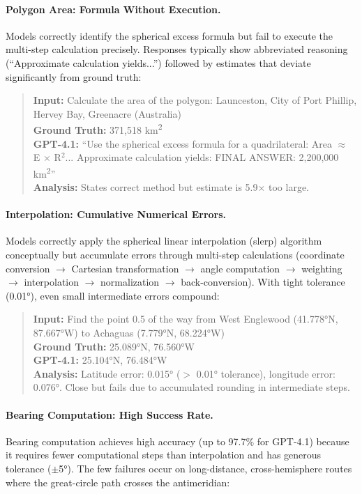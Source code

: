 \paragraph{Polygon Area: Formula Without Execution.}
Models correctly identify the spherical excess formula but fail to execute the multi-step calculation precisely. Responses typically show abbreviated reasoning (``Approximate calculation yields...'') followed by estimates that deviate significantly from ground truth:

\begin{quote}
\small
\textbf{Input:} Calculate the area of the polygon: Launceston, City of Port Phillip, Hervey Bay, Greenacre (Australia)\\
\textbf{Ground Truth:} 371,518 km\textsuperscript{2}\\
\textbf{GPT-4.1:} ``Use the spherical excess formula for a quadrilateral: Area $\approx$ E $\times$ R$^2$... Approximate calculation yields: FINAL ANSWER: 2,200,000 km\textsuperscript{2}''\\
\textbf{Analysis:} States correct method but estimate is 5.9$\times$ too large.
\end{quote}

\paragraph{Interpolation: Cumulative Numerical Errors.}
Models correctly apply the spherical linear interpolation (slerp) algorithm conceptually but accumulate errors through multi-step calculations (coordinate conversion $\rightarrow$ Cartesian transformation $\rightarrow$ angle computation $\rightarrow$ weighting $\rightarrow$ interpolation $\rightarrow$ normalization $\rightarrow$ back-conversion). With tight tolerance (0.01°), even small intermediate errors compound:

\begin{quote}
\small
\textbf{Input:} Find the point 0.5 of the way from West Englewood (41.778°N, 87.667°W) to Achaguas (7.779°N, 68.224°W)\\
\textbf{Ground Truth:} 25.089°N, 76.560°W\\
\textbf{GPT-4.1:} 25.104°N, 76.484°W\\
\textbf{Analysis:} Latitude error: 0.015° ($>$ 0.01° tolerance), longitude error: 0.076°. Close but fails due to accumulated rounding in intermediate steps.
\end{quote}

\paragraph{Bearing Computation: High Success Rate.}
Bearing computation achieves high accuracy (up to 97.7\% for GPT-4.1) because it requires fewer computational steps than interpolation and has generous tolerance ($\pm$5°). The few failures occur on long-distance, cross-hemisphere routes where the great-circle path crosses the antimeridian:

